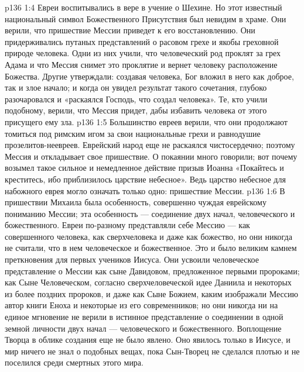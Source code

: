 \vs p136 1:4 \pc Евреи воспитывались в вере в учение о Шехине. Но этот известный национальный символ Божественного Присутствия был невидим в храме. Они верили, что пришествие Мессии приведет к его восстановлению. Они придерживались путаных представлений о расовом грехе и якобы греховной природе человека. Одни из них учили, что человеческий род проклят за грех Адама и что Мессия снимет это проклятие и вернет человеку расположение Божества. Другие утверждали: создавая человека, Бог вложил в него как доброе, так и злое начало; и когда он увидел результат такого сочетания, глубоко разочаровался и «раскаялся Господь, что создал человека». Те, кто учили подобному, верили, что Мессия придет, дабы избавить человека от этого присущего ему зла.
\vs p136 1:5 Большинство евреев верили, что они продолжают томиться под римским игом за свои национальные грехи и равнодушие прозелитов\hyp{}неевреев. Еврейский народ еще не раскаялся чистосердечно; поэтому Мессия и откладывает свое пришествие. О покаянии много говорили; вот почему возымел такое сильное и немедленное действие призыв Иоанна «Покайтесь и креститесь, ибо приблизилось царствие небесное». Ведь царство небесное для набожного еврея могло означать только одно: пришествие Мессии.
\vs p136 1:6 В пришествии Михаила была особенность, совершенно чуждая еврейскому пониманию Мессии; эта особенность --- соединение двух начал, человеческого и божественного. Евреи по\hyp{}разному представляли себе Мессию --- как совершенного человека, как сверхчеловека и даже как божество, но они никогда не считали, что в нем  человеческое и божественное. Это и было великим камнем преткновения для первых учеников Иисуса. Они усвоили человеческое представление о Мессии как сыне Давидовом, предложенное первыми пророками; как Сыне Человеческом, согласно сверхчеловеческой идее Даниила и некоторых из более поздних пророков, и даже как Сыне Божием, каким изображали Мессию автор книги Еноха и некоторые из его современников; но они никогда ни на единое мгновение не верили в истинное представление о соединении в одной земной личности двух начал --- человеческого и божественного. Воплощение Творца в облике создания еще не было явлено. Оно явилось только в Иисусе, и мир ничего не знал о подобных вещах, пока Сын\hyp{}Творец не сделался плотью и не поселился среди смертных этого мира.
